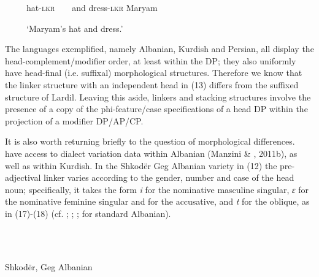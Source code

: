 \documentclass[output=paper]{langsci/langscibook}
\begin{document}
\begin{styleSfondomedioiColorexxi}
\end{styleSfondomedioiColorexxi}

\begin{styleSfondomedioiColorexxi}
~ ~ ~   hat-\textsc{lkr}  ~ ~   and   dress-\textsc{lkr}   Maryam
\end{styleSfondomedioiColorexxi}

\begin{styleSfondomedioiColorexxi}
~ ~ ~   ‘Maryam’s hat and dress.’               
\end{styleSfondomedioiColorexxi}

\begin{styleSfondomedioiColorexxi}
 The languages exemplified, namely Albanian, Kurdish and Persian, all display the head-complement/modifier order, at least within the DP; they also uniformly have head-final (i.e. suffixal) morphological structures. Therefore we know that the linker structure with an independent head in (13) differs from the suffixed structure of Lardil. Leaving this aside, linkers and stacking structures involve the presence of a copy of the phi-feature/case specifications of a head DP within the projection of a modifier DP/AP/CP.   
\end{styleSfondomedioiColorexxi}

\begin{styleSfondomedioiColorexxi}
It is also worth returning briefly to the question of morphological differences. \citet{FrancoEtAl2015} have access to dialect variation data within Albanian (Manzini \& \citealt{Savoia2011a}, 2011b), as well as within Kurdish. In the Shkodër Geg Albanian variety in (12) the pre-adjectival linker varies according to the gender, number and case of the head noun; specifically, it takes the form \textit{i} for the nominative masculine singular, \textit{ɛ} for the nominative feminine singular and for the accusative, and \textit{t} for the oblique, as in (17)-(18) (cf. \citealt{Solano1972}; \citealt{Camaj1984}; \citealt{Turano2004}; \citealt{Campos2008} for standard Albanian).
\end{styleSfondomedioiColorexxi}

\begin{styleSfondomedioiColorexxi}
\ea%
    \label{ex:key:17}
    \gll\\
        \\
    \glt
    \z

          Shkodër, Geg Albanian  
\end{styleSfondomedioiColorexxi}
\end{document}
